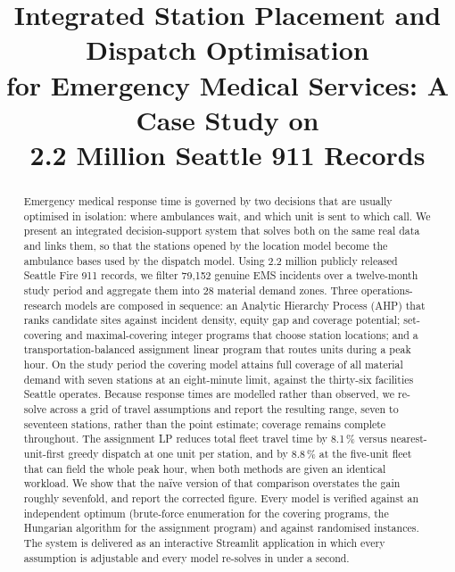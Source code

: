 \documentclass[conference]{IEEEtran}
\begin{document}
\title{Integrated Station Placement and Dispatch Optimisation\\for Emergency
Medical Services: A Case Study on\\2.2 Million Seattle 911 Records}

\author{
\and
{}
\and
{}
\and
{}
}

\maketitle

\begin{abstract}
Emergency medical response time is governed by two decisions that are usually
optimised in isolation: where ambulances wait, and which unit is sent to which
call. We present an integrated decision-support system that solves both on the
same real data and links them, so that the stations opened by the location model
become the ambulance bases used by the dispatch model. Using 2.2 million
publicly released Seattle Fire 911 records, we filter 79{,}152 genuine EMS
incidents over a twelve-month study period and aggregate them into 28 material
demand zones. Three operations-research models are composed in sequence: an
Analytic Hierarchy Process (AHP) that ranks candidate sites against incident
density, equity gap and coverage potential; set-covering and maximal-covering
integer programs that choose station locations; and a transportation-balanced
assignment linear program that routes units during a peak hour. On the study
period the covering model attains full coverage of all material demand with
seven stations at an eight-minute limit, against the thirty-six facilities
Seattle operates. Because response times are modelled rather than observed, we
re-solve across a grid of travel assumptions and report the resulting range,
seven to seventeen stations, rather than the point estimate; coverage remains
complete throughout. The assignment LP reduces total fleet travel time by
8.1\,\% versus nearest-unit-first greedy dispatch at one unit per station, and
by 8.8\,\% at the five-unit fleet that can field the whole peak hour, when both
methods are given an identical workload. We show that the na\"ive version of that comparison overstates the gain
roughly sevenfold, and report the corrected figure. Every model is verified
against an independent optimum (brute-force enumeration for the covering
programs, the Hungarian algorithm for the assignment program) and against
randomised instances. The system is delivered as an interactive Streamlit
application in which every assumption is adjustable and every model re-solves in
under a second.
\end{abstract}
\end{document}
